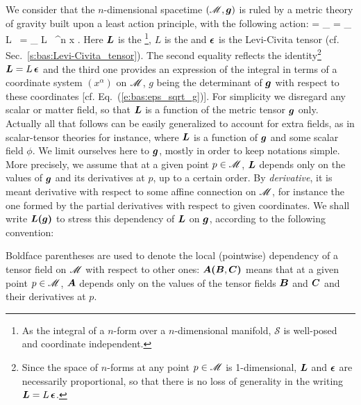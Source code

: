 We consider that the $n$-dimensional spacetime $(\mathscr{M},\bm{g})$ is ruled by a metric theory of gravity built upon
a least action principle, with the following action:
\be \label{e:tha:action_L}
     = \int_{\M}  = \int_{\M} L \, \weps = \int_{\M} L  \, \D^n x .
\ee
Here $\bm{L}$ is the \footnote{As the integral of a $n$-form over a $n$-dimensional manifold, $\mathcal{S}$ is well-posed and coordinate independent.},
$L$ is the 
and
$\bm{\epsilon}$ is the Levi-Civita tensor (cf. Sec.~\ref{s:bas:Levi-Civita_tensor}).
The second equality reflects the identity\footnote{Since the space of $n$-forms at any
point $p\in\mathscr{M}$ is 1-dimensional, $\bm{L}$ and $\bm{\epsilon}$ are
necessarily proportional, so that there is no loss of generality in the writing
$\bm{L} = L \, \bm{\epsilon}$.} $\bm{L} = L \, \bm{\epsilon}$ and the third one provides an expression of the integral
in terms of a coordinate system $(x^\alpha)$ on $\mathscr{M}$, $g$ being the determinant of
$\bm{g}$ with respect to these coordinates [cf. Eq.~(\ref{e:bas:eps_sqrt_g})].
For simplicity we disregard any scalar or matter field, so that
$\bm{L}$ is a function of the metric tensor $\bm{g}$ only.
Actually all that follows can be easily generalized to account for
extra fields, as in scalar-tensor theories for instance, where $\bm{L}$ is a function
of $\bm{g}$ and some scalar field $\phi$. We limit ourselves here to $\bm{g}$,
mostly in order to keep notations simple.
More precisely, we assume that at a given point $p\in\mathscr{M}$, $\bm{L}$ depends only
on the values of $\bm{g}$ and its derivatives at $p$, up to a certain order.
By \emph{derivative}, it is
meant derivative with respect to some affine connection on $\mathscr{M}$, for instance the one
formed by the partial derivatives with respect to given coordinates. We shall
write $\bm{L}\textbf{(}\bm{g}\textbf{)}$ to stress this dependency of $\bm{L}$ on $\bm{g}$, according
to the following convention:
\begin{notation}
\label{n:tha:bold_parentheses}
Boldface parentheses are used to denote the local (pointwise) dependency of a
tensor field on $\mathscr{M}$ with respect to other ones: $\bm{A}\textbf{(} \bm{B}, \bm{C} \textbf{)}$
means that at a given point $p\in\mathscr{M}$, $\bm{A}$ depends only
on the values of the tensor fields $\bm{B}$ and $\bm{C}$ and their derivatives at $p$.
\end{notation}

